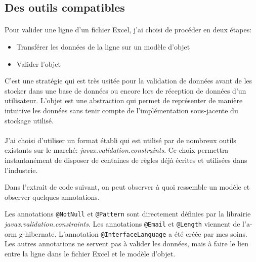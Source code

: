 \subsection{Des outils compatibles}
\label{subsec:compatible-tools}

\paragraph{}
Pour valider une ligne d'un fichier Excel, j'ai choisi de procéder en deux étapes:
\begin{itemize}
    \item Transférer les données de la ligne sur un modèle d'objet
    \item Valider l'objet
\end{itemize}
C'est une stratégie qui est très usitée pour la validation de données avant de les stocker dans une base de données ou encore lors de réception de données d'un utilisateur.
L'objet est une abstraction qui permet de représenter de manière intuitive les données sans tenir compte de l'implémentation sous-jacente du stockage utilisé.

\paragraph{}
J'ai choisi d'utiliser un format établi qui est utilisé par de nombreux outils existants sur le marché: \textit{javax.validation.constraints}.
Ce choix permettra instantanément de disposer de centaines de règles déjà écrites et utilisées dans l'industrie.

Dans l'extrait de code suivant, on peut observer à quoi ressemble un modèle et observer quelques annotations.

Les annotations \lstinline{@NotNull} et \lstinline{@Pattern} sont directement définies par la librairie \textit{javax.validation.constraints}.
Les annotations \lstinline{@Email} et \lstinline{@Length} viennent de l'\gls{a-orm} \Gls{g-hibernate}.
L'annotation \lstinline{@InterfaceLanguage} a été créée par mes soins.
Les autres annotations ne servent pas à valider les données, mais à faire le lien entre la ligne dans le fichier Excel et le modèle d'objet.
